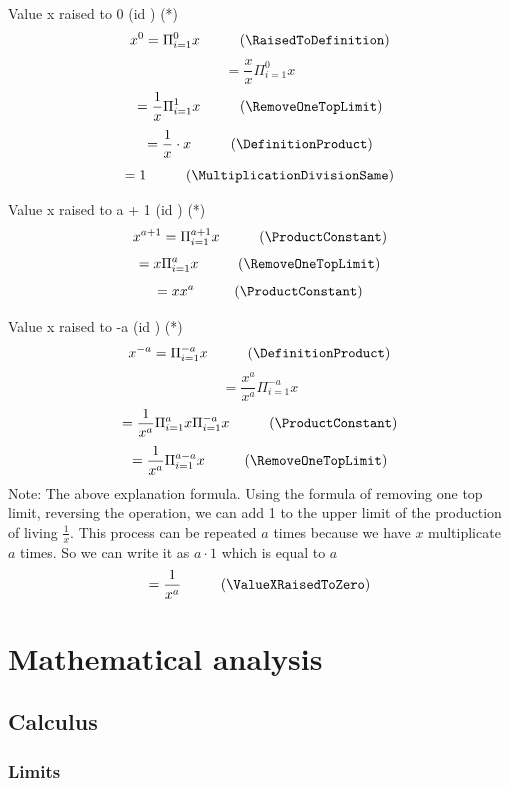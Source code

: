 \documentclass{book}
\begin{document}
                Value x raised to 0 (id \ValueXRaisedToZero) (*)
                \[x^0 = \Pi^0_{i = 1}x \hspace{1cm} (\RaisedToDefinition)\]
                \[= \frac{x}{x} \Pi^0_{i=1} x\]
                \[= \frac{1}{x} \Pi^1_{i=1}x \hspace{1cm} (\RemoveOneTopLimit)\]
                \[= \frac{1}{x} \cdot x  \hspace{1cm} (\DefinitionProduct)\]
                \[= 1 \hspace{1cm} (\MultiplicationDivisionSame)\]

                Value x raised to a + 1 (id \ValueXRaisedPlus) (*)
                \[x^{a + 1} = \Pi^{a + 1}_{i=1} x \hspace{1cm} (\ProductConstant)\]
                \[= x\Pi^{a}_{i=1}x \hspace{1cm} (\RemoveOneTopLimit)\]
                \[= x x^a \hspace{1cm} (\ProductConstant)\]

                Value x raised to -a (id \ValueRaisedNegative) (*)
                \[x^{-a} = \Pi^{-a}_{i=1}x \hspace{1cm} (\DefinitionProduct)\]
                \[= \frac{x^a}{x^a} \Pi^{-a}_{i=1} x\]
                \[= \frac{1}{x^a} \Pi^a_{i=1} x \Pi^{-a}_{i=1} x \hspace{1cm} (\ProductConstant)\]
                \[= \frac{1}{x^a} \Pi^{a-a}_{i=1} x \hspace{1cm} (\RemoveOneTopLimit)\]
                Note: The above explanation formula. Using the formula of removing one top limit, reversing the operation, we can add 1 to the upper limit of the production of living $\frac{1}{x}$. This process can be repeated $a$ times because we have $x$ multiplicate $a$ times. So we can write it as $a \cdot 1$ which is equal to $a$
                \[= \frac{1}{x^a} \hspace{1cm} (\ValueXRaisedToZero)\]
            
    \chapter{Mathematical analysis}                    
        \section{Calculus}
            \subsection{Limits}
\end{document}
